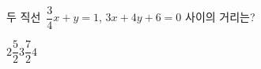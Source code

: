 두 직선~$\dfrac{3}{4}x+y=1$, $3x+4y+6=0$ 사이의 거리는?
\begin{choices32}{$2$}{$\dfrac{5}{2}$}{$3$}{$\dfrac{7}{2}$}{$4$}\end{choices32}
